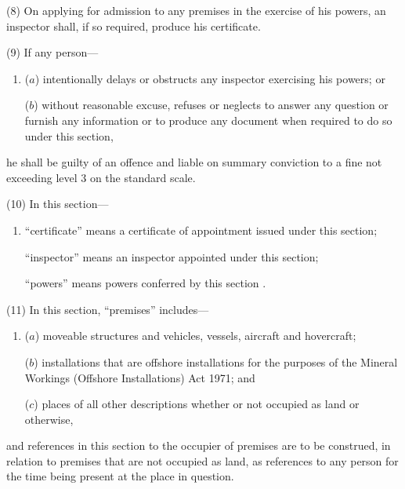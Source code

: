 \documentclass[12pt,a4paper]{article}
\begin{document}
(8) On applying for admission to any premises in the exercise of his powers, an inspector shall, if so required, produce his certificate.

(9) If any person—
\begin{enumerate}\item[]
($a$) intentionally delays or obstructs any inspector exercising his powers; or

($b$) without reasonable excuse, refuses or neglects to answer any question or furnish any information or to produce any document when required to do so under this section,
\end{enumerate}
he shall be guilty of an offence and liable on summary conviction to a fine not exceeding level 3 on the standard scale.

(10) In this section—
\begin{enumerate}\item[]
    “certificate” means a certificate of appointment issued under this section;

    “inspector” means an inspector appointed under this section;

    “powers” means powers conferred by this section%
%
. 
\end{enumerate}

(11) In this section, “premises” includes—
\begin{enumerate}\item[]
($a$) moveable structures and vehicles, vessels, aircraft and hovercraft;

($b$) installations that are offshore installations for the purposes of the Mineral Workings (Offshore Installations) Act 1971; and

($c$) places of all other descriptions whether or not occupied as land or otherwise,
\end{enumerate}
and references in this section to the occupier of premises are to be construed, in relation to premises that are not occupied as land, as references to any person for the time being present at the place in question.
\end{document}

